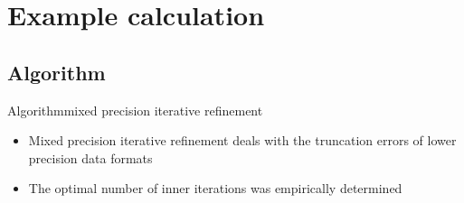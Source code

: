 \documentclass[10pt]{beamer}
\begin{document}
\section{Example calculation}
\subsection{Algorithm}
\begin{frame}{Algorithm}{mixed precision iterative refinement}
 \begin{algorithm}[H]
  \begin{algorithmic}[1]
    \ENDWHILE
  \end{algorithmic}
\caption{mixed precision iterative refinement}
\label{alg:seq}
\end{algorithm}
\begin{itemize}
 \item Mixed precision iterative refinement deals with the truncation errors of lower precision data formats
 \item The optimal number of inner iterations was empirically determined

\end{itemize}

\end{frame}
\end{document}
